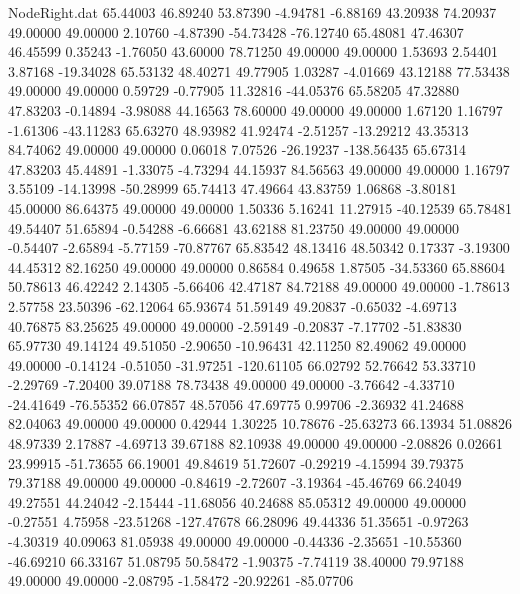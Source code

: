 \begin{filecontents}{NodeRight.dat}
  65.44003   46.89240   53.87390    -4.94781   -6.88169   43.20938   74.20937   49.00000   49.00000    2.10760   -4.87390  -54.73428  -76.12740
  65.48081   47.46307   46.45599     0.35243   -1.76050   43.60000   78.71250   49.00000   49.00000    1.53693    2.54401    3.87168  -19.34028
  65.53132   48.40271   49.77905     1.03287   -4.01669   43.12188   77.53438   49.00000   49.00000    0.59729   -0.77905   11.32816  -44.05376
  65.58205   47.32880   47.83203    -0.14894   -3.98088   44.16563   78.60000   49.00000   49.00000    1.67120    1.16797   -1.61306  -43.11283
  65.63270   48.93982   41.92474    -2.51257  -13.29212   43.35313   84.74062   49.00000   49.00000    0.06018    7.07526  -26.19237 -138.56435
  65.67314   47.83203   45.44891    -1.33075   -4.73294   44.15937   84.56563   49.00000   49.00000    1.16797    3.55109  -14.13998  -50.28999
  65.74413   47.49664   43.83759     1.06868   -3.80181   45.00000   86.64375   49.00000   49.00000    1.50336    5.16241   11.27915  -40.12539
  65.78481   49.54407   51.65894    -0.54288   -6.66681   43.62188   81.23750   49.00000   49.00000   -0.54407   -2.65894   -5.77159  -70.87767
  65.83542   48.13416   48.50342     0.17337   -3.19300   44.45312   82.16250   49.00000   49.00000    0.86584    0.49658    1.87505  -34.53360
  65.88604   50.78613   46.42242     2.14305   -5.66406   42.47187   84.72188   49.00000   49.00000   -1.78613    2.57758   23.50396  -62.12064
  65.93674   51.59149   49.20837    -0.65032   -4.69713   40.76875   83.25625   49.00000   49.00000   -2.59149   -0.20837   -7.17702  -51.83830
  65.97730   49.14124   49.51050    -2.90650  -10.96431   42.11250   82.49062   49.00000   49.00000   -0.14124   -0.51050  -31.97251 -120.61105
  66.02792   52.76642   53.33710    -2.29769   -7.20400   39.07188   78.73438   49.00000   49.00000   -3.76642   -4.33710  -24.41649  -76.55352
  66.07857   48.57056   47.69775     0.99706   -2.36932   41.24688   82.04063   49.00000   49.00000    0.42944    1.30225   10.78676  -25.63273
  66.13934   51.08826   48.97339     2.17887   -4.69713   39.67188   82.10938   49.00000   49.00000   -2.08826    0.02661   23.99915  -51.73655
  66.19001   49.84619   51.72607    -0.29219   -4.15994   39.79375   79.37188   49.00000   49.00000   -0.84619   -2.72607   -3.19364  -45.46769
  66.24049   49.27551   44.24042    -2.15444  -11.68056   40.24688   85.05312   49.00000   49.00000   -0.27551    4.75958  -23.51268 -127.47678
  66.28096   49.44336   51.35651    -0.97263   -4.30319   40.09063   81.05938   49.00000   49.00000   -0.44336   -2.35651  -10.55360  -46.69210
  66.33167   51.08795   50.58472    -1.90375   -7.74119   38.40000   79.97188   49.00000   49.00000   -2.08795   -1.58472  -20.92261  -85.07706

\end{filecontents}

